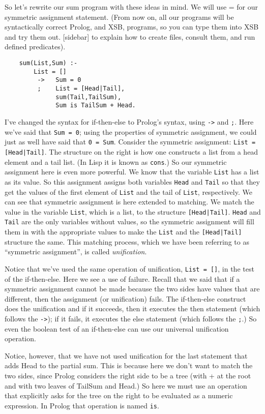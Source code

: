 So let's rewrite our sum program with these ideas in mind.  We will
use = for our symmetric assignment statement.  (From now on, all our
programs will be syntactically correct Prolog, and XSB, programs, so
you can type them into XSB and try them out. [sidebar] to explain how
to create files, consult them, and run defined predicates).

\begin{verbatim}
    sum(List,Sum) :-
        List = []
         ->   Sum = 0
         ;    List = [Head|Tail],
              sum(Tail,TailSum),
              Sum is TailSum + Head.
\end{verbatim}
I've changed the syntax for if-then-else to Prolog's syntax, using
\verb|->| and \verb|;|.  Here we've said that \verb|Sum = 0|; using
the properties of symmetric assignment, we could just as well have
said that \verb|0 = Sum|.  Consider the symmetric assignment:
\verb^List = [Head|Tail]^.  The structure on the right is how one
constructs a list from a head element and a tail list.  (In Lisp it is
known as \verb|cons|.)  So our symmetric assignment here is even more
powerful.  We know that the variable \verb|List| has a list as its
value.  So this assignment assigns both variables \verb|Head| and
\verb|Tail| so that they get the values of the first element of
\verb|List| and the tail of \verb|List|, respectively.  We can see
that symmetric assignment is here extended to matching.  We match the
value in the variable \verb|List|, which is a list, to the structure
\verb^[Head|Tail]^.  \verb|Head| and \verb|Tail| are the only variables
without values, so the symmetric assignment will fill them in with the
appropriate values to make the \verb|List| and the \verb^[Head|Tail]^
structure the same.  This matching process, which we have been
referring to as ``symmetric assignment'', is called {\em unification}.

Notice that we've used the same operation of unification, 
\verb|List = []|, 
in the test of the if-then-else.  Here we see a use of failure.
Recall that we said that if a symmetric assignment cannot be made
because the two sides have values that are different, then the
assignment (or unification) fails.  The if-then-else construct does
the unification and if it succeeds, then it executes the then
statement (which follows the \verb|->|); if it fails, it executes the
else statement (which follows the \verb|;|.)  So even the boolean test
of an if-then-else can use our universal unification operation.

Notice, however, that we have not used unification for the last
statement that adds Head to the partial sum.  This is because here we
don't want to match the two sides, since Prolog considers the right
side to be a tree (with + at the root and with two leaves of TailSum
and Head.)  So here we must use an operation that explicitly asks for
the tree on the right to be evaluated as a numeric expression.  In
Prolog that operation is named \verb|is|.

